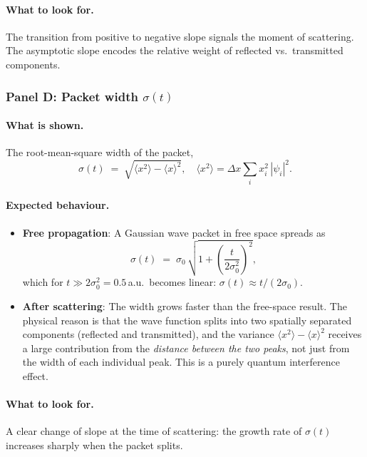 \documentclass[12pt, a4paper]{article}
\newcommand{\dx}{\Delta x}
\begin{document}
\paragraph{What to look for.}
The transition from positive to negative slope signals the moment of
scattering.  The asymptotic slope encodes the relative weight of reflected
vs.\ transmitted components.

\subsubsection{Panel D: Packet width $\sigma(t)$}

\paragraph{What is shown.}
The root-mean-square width of the packet,
\begin{equation}
  \sigma(t) \;=\; \sqrt{\langle x^2\rangle - \langle x\rangle^2},
  \quad
  \langle x^2\rangle = \dx\sum_i x_i^2\,|\psi_i|^2.
\end{equation}

\paragraph{Expected behaviour.}
\begin{itemize}
  \item \textbf{Free propagation}: A Gaussian wave packet in free space
        spreads as
        \begin{equation}
          \sigma(t) \;=\; \sigma_0\,\sqrt{1 + \left(\frac{t}{2\sigma_0^2}\right)^2},
          \label{eq:spreading}
        \end{equation}
        which for $t \gg 2\sigma_0^2 = 0.5$\,a.u.\ becomes linear:
        $\sigma(t) \approx t/(2\sigma_0)$.

  \item \textbf{After scattering}: The width grows faster than the free-space
        result.  The physical reason is that the wave function splits into
        two spatially separated components (reflected and transmitted), and
        the variance $\langle x^2\rangle - \langle x\rangle^2$ receives a
        large contribution from the \emph{distance between the two peaks},
        not just from the width of each individual peak.  This is a
        purely quantum interference effect.
\end{itemize}

\paragraph{What to look for.}
A clear change of slope at the time of scattering: the growth rate of
$\sigma(t)$ increases sharply when the packet splits.
\end{document}
